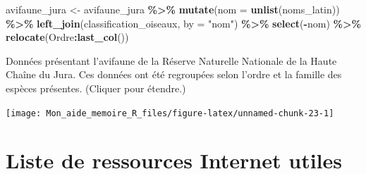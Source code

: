 \documentclass[
  french,
]{book}
\newenvironment{Shaded}{\begin{snugshade}}{\end{snugshade}}
\newcommand{\CommentTok}[1]{\textcolor[rgb]{0.56,0.35,0.01}{\textit{#1}}}
\newcommand{\DataTypeTok}[1]{\textcolor[rgb]{0.13,0.29,0.53}{#1}}
\newcommand{\KeywordTok}[1]{\textcolor[rgb]{0.13,0.29,0.53}{\textbf{#1}}}
\newcommand{\NormalTok}[1]{#1}
\newcommand{\OperatorTok}[1]{\textcolor[rgb]{0.81,0.36,0.00}{\textbf{#1}}}
\newcommand{\StringTok}[1]{\textcolor[rgb]{0.31,0.60,0.02}{#1}}
\begin{document}
\begin{Shaded}
\end{Shaded}

\begin{Shaded}
\begin{Highlighting}[]
\NormalTok{avifaune\_jura \textless{}{-}}\StringTok{ }\NormalTok{avifaune\_jura }\OperatorTok{\%\textgreater{}\%}
\StringTok{  }\KeywordTok{mutate}\NormalTok{(}\DataTypeTok{nom =} \KeywordTok{unlist}\NormalTok{(noms\_latin)) }\OperatorTok{\%\textgreater{}\%}
\StringTok{  }\KeywordTok{left\_join}\NormalTok{(classification\_oiseaux, }\DataTypeTok{by =} \StringTok{"nom"}\NormalTok{) }\OperatorTok{\%\textgreater{}\%}
\StringTok{  }\KeywordTok{select}\NormalTok{(}\OperatorTok{{-}}\NormalTok{nom) }\OperatorTok{\%\textgreater{}\%}
\StringTok{  }\KeywordTok{relocate}\NormalTok{(Ordre}\OperatorTok{:}\KeywordTok{last\_col}\NormalTok{())}
\end{Highlighting}
\end{Shaded}

\label{tab:avifaune-famille}Données présentant l'avifaune de la Réserve Naturelle Nationale de la Haute Chaîne du Jura. Ces données ont été regroupées selon l'ordre et la famille des espèces présentes. (Cliquer pour étendre.)

\begin{center}\texttt{[image: Mon\_aide\_memoire\_R\_files/figure-latex/unnamed-chunk-23-1]} \end{center}

\hypertarget{ref-data-analysis}{%
\section*{Liste de ressources Internet utiles}\label{ref-data-analysis}}
\end{document}
